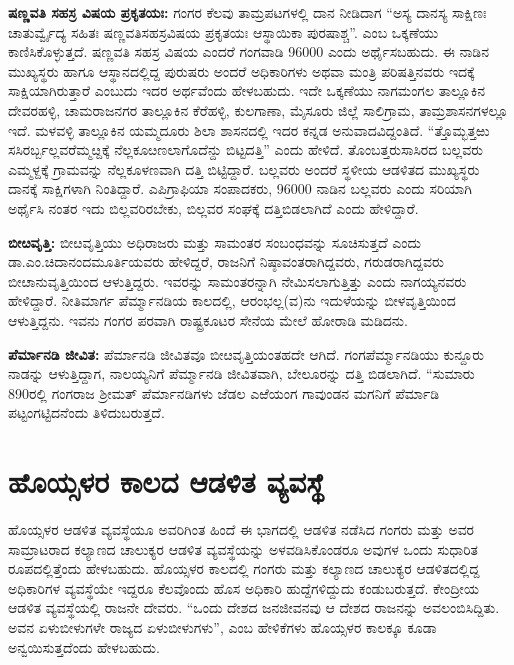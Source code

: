 \textbf{ಷಣ್ಣವತಿ ಸಹಸ್ರ ವಿಷಯ ಪ್ರಕೃತಯಃ:} ಗಂಗರ ಕೆಲವು ತಾಮ್ರಪಟಗಳಲ್ಲಿ ದಾನ ನೀಡಿದಾಗ “ಅಸ್ಯ ದಾನಸ್ಯ ಸಾಕ್ಷಿಣಃ ಚಾತುರ್ವ್ವೈದ್ಯ ಸಹಿತಃ ಷಣ್ಣವತಿಸಹಸ್ರವಿಷಯ ಪ್ರಕೃತಯಃ ಆಸ್ಥಾಯಿಕಾ ಪುರಷಾಶ್ಚ”. ಎಂಬ ಒಕ್ಕಣೆಯು ಕಾಣಿಸಿಕೊಳ್ಳುತ್ತದೆ. ಷಣ್ಣವತಿ ಸಹಸ್ರ ವಿಷಯ ಎಂದರೆ ಗಂಗವಾಡಿ 96000 ಎಂದು ಅರ್ಥೈಸಬಹುದು. ಈ ನಾಡಿನ ಮುಖ್ಯಸ್ಥರು ಹಾಗೂ ಆಸ್ಥಾನದಲ್ಲಿದ್ದ ಪುರುಷರು ಅಂದರೆ ಅಧಿಕಾರಿಗಳು ಅಥವಾ ಮಂತ್ರಿ ಪರಿಷತ್ತಿನವರು ಇದಕ್ಕೆ ಸಾಕ್ಷಿಯಾಗಿರುತ್ತಾರೆ ಎಂಬುದು ಇದರ ಅರ್ಥವೆಂದು ಹೇಳಬಹುದು. ಇದೇ ಒಕ್ಕಣೆಯು ನಾಗಮಂಗಲ ತಾಲ್ಲೂಕಿನ ದೇವರಹಳ್ಳಿ, ಚಾಮರಾಜನಗರ ತಾಲ್ಲೂಕಿನ ಕೆರೆಹಳ್ಳಿ, ಕುಲಗಾಣಾ, ಮೈಸೂರು ಜಿಲ್ಲೆ ಸಾಲಿಗ್ರಾಮ, ತಾಮ್ರಶಾಸನಗಳಲ್ಲೂ ಇದೆ. ಮಳವಳ್ಳಿ ತಾಲ್ಲೂಕಿನ ಯಮ್ಮದೂರು ಶಿಲಾ ಶಾಸನದಲ್ಲಿ ಇದರ ಕನ್ನಡ ಅನುವಾದವಿದ್ದಂತಿದೆ. “ತ್ತೊಮ್ಭತ್ತಱು ಸಸಿರರ್ಬ್ಬಲ್ಲವರೆಮ್ಮೞ್ದಕ್ಕೆ ನೆಲ್ಲಕೂೞಣಲಾಗೊದೆನ್ದು ಬಿಟ್ಟದತ್ತಿ” ಎಂದು ಹೇಳಿದೆ. ತೊಂಬತ್ತರುಸಾಸಿರದ ಬಲ್ಲವರು ಎಮ್ಮಳ್ದಕ್ಕೆ ಗ್ರಾಮವನ್ನು ನೆಲ್ಲಕೂಳಣವಾಗಿ ದತ್ತಿ ಬಿಟ್ಟಿದ್ದಾರೆ. ಬಲ್ಲವರು ಅಂದರೆ ಸ್ಥಳೀಯ ಆಡಳಿತದ ಮುಖ್ಯಸ್ಥರು ದಾನಕ್ಕೆ ಸಾಕ್ಷಿಗಳಾಗಿ ನಿಂತಿದ್ದಾರೆ. ಎಪಿಗ್ರಾಫಿಯಾ ಸಂಪಾದಕರು, 96000 ನಾಡಿನ ಬಲ್ಲವರು ಎಂದು ಸರಿಯಾಗಿ ಅರ್ಥೈಸಿ ನಂತರ ಇದು ಬಿಲ್ಲವರಿರಬೇಕು, ಬಿಲ್ಲವರ ಸಂಘಕ್ಕೆ ದತ್ತಿಬಿಡಲಾಗಿದೆ ಎಂದು ಹೇಳಿದ್ದಾರೆ.

\textbf{ಬೀೞವೃತ್ತಿ:} ಬೀೞವೃತ್ತಿಯು ಅಧಿರಾಜರು ಮತ್ತು ಸಾಮಂತರ ಸಂಬಂಧವನ್ನು ಸೂಚಿಸುತ್ತದೆ ಎಂದು ಡಾ.ಎಂ.\-ಚಿದಾನಂದಮೂರ್ತಿಯವರು ಹೇಳಿದ್ದರೆ, ರಾಜನಿಗೆ ನಿಷ್ಠಾವಂತರಾಗಿದ್ದವರು, ಗರುಡರಾಗಿದ್ದವರು ಬೀೞಾನುವೃತ್ತಿಯಿಂದ ಆಳುತ್ತಿದ್ದರು. ಇವರನ್ನು ಸಾಮಂತರನ್ನಾಗಿ ನೇಮಿಸಲಾಗುತ್ತಿತ್ತು ಎಂದು ನಾಗಯ್ಯನವರು ಹೇಳಿದ್ದಾರೆ. ನೀತಿಮಾರ್ಗ ಪೆರ್ಮ್ಮಾನಡಿಯ ಕಾಲದಲ್ಲಿ, ಆರಂಭಲ್ಲ(ವ)ನು ಇದುಳೆಯನ್ನು ಬೀಳವೃತ್ತಿಯಿಂದ ಆಳುತ್ತಿದ್ದನು. ಇವನು ಗಂಗರ ಪರವಾಗಿ ರಾಷ್ಟ್ರಕೂಟರ ಸೇನೆಯ ಮೇಲೆ ಹೋರಾಡಿ ಮಡಿದನು.

\textbf{ಪೆರ್ಮಾನಡಿ ಜೀವಿತ:} ಪೆರ್ಮಾನಡಿ ಜೀವಿತವೂ ಬೀೞವೃತ್ತಿಯಂತಹದೇ ಆಗಿದೆ. ಗಂಗಪೆರ್ಮ್ಮಾನಡಿಯು ಕುನ್ದೂರು ನಾಡನ್ನು ಆಳುತ್ತಿದ್ದಾಗ, ನಾಲಯ್ಯನಿಗೆ ಪೆರ್ಮ್ಮಾನಡಿ ಜೀವಿತವಾಗಿ, ಬೇಲೂರನ್ನು ದತ್ತಿ ಬಿಡಲಾಗಿದೆ. “ಸುಮಾರು 890ರಲ್ಲಿ ಗಂಗರಾಜ ಶ‍್ರೀಮತ್​ ಪೆರ್ಮಾನಡಿಗಳು ಜೆಡಲ ಎಱೆಯಂಗ ಗಾವುಂಡನ ಮಗನಿಗೆ ಪೆರ್ಮಾಡಿ ಪಟ್ಟಂಗಟ್ಟಿದನೆಂದು ತಿಳಿದುಬರುತ್ತದೆ.


\section{ಹೊಯ್ಸಳರ ಕಾಲದ ಆಡಳಿತ ವ್ಯವಸ್ಥೆ}

ಹೊಯ್ಸಳರ ಆಡಳಿತ ವ್ಯವಸ್ಥೆಯೂ ಅವರಿಗಿಂತ ಹಿಂದೆ ಈ ಭಾಗದಲ್ಲಿ ಆಡಳಿತ ನಡೆಸಿದ ಗಂಗರು ಮತ್ತು ಅವರ ಸಾಮ್ರಾಟರಾದ ಕಲ್ಯಾಣದ ಚಾಲುಕ್ಯರ ಆಡಳಿತ ವ್ಯವಸ್ಥೆಯನ್ನು ಅಳವಡಿಸಿಕೊಂಡರೂ ಅವುಗಳ ಒಂದು ಸುಧಾರಿತ ರೂಪದಲ್ಲಿತ್ತೆಂದು ಹೇಳಬಹುದು. ಹೊಯ್ಸಳರ ಕಾಲದಲ್ಲಿ ಗಂಗರು ಮತ್ತು ಕಲ್ಯಾಣದ ಚಾಲುಕ್ಯರ ಆಡಳಿತದಲ್ಲಿದ್ದ ಅಧಿಕಾರಿಗಳ ವ್ಯವಸ್ಥೆಯೇ ಇದ್ದರೂ ಕೆಲವೊಂದು ಹೊಸ ಅಧಿಕಾರಿ ಹುದ್ದೆಗಳಿದ್ದುದು ಕಂಡುಬರುತ್ತದೆ. ಕೇಂದ್ರೀಯ ಆಡಳಿತ ವ್ಯವಸ್ಥೆಯಲ್ಲಿ ರಾಜನೇ ದೇವರು. “ಒಂದು ದೇಶದ ಜನಜೀವನವು ಆ ದೇಶದ ರಾಜನನ್ನು ಅವಲಂಬಿಸಿದ್ದಿತು. ಅವನ ಏಳುಬೀಳುಗಳೇ ರಾಜ್ಯದ ಏಳುಬೀಳುಗಳು”, ಎಂಬ ಹೇಳಿಕೆಗಳು ಹೊಯ್ಸಳರ ಕಾಲಕ್ಕೂ ಕೂಡಾ ಅನ್ವಯಿಸುತ್ತದೆಂದು ಹೇಳಬಹುದು.

